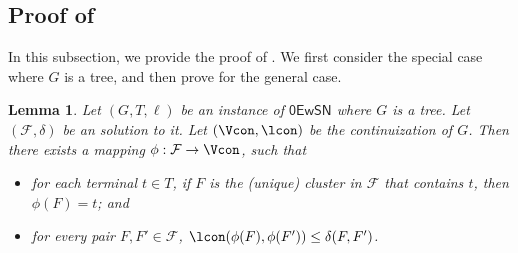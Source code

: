 \documentclass[11pt]{article}
\newtheorem{lemma}[theorem]{Lemma}
\theoremstyle{definition}
\newcommand{\fset}{{\mathcal{F}}}
\newcommand{\zesn}{\mathsf{0EwSN}}
\begin{document}
\subsection{Proof of }
\label{subsec: diam-girth}


In this subsection, we provide the proof of . We first consider the special case where $G$ is a tree, and then prove  for the general case.

\begin{lemma} \label{lem:embed-tree}
Let $(G,T,\ell)$ be an instance of $\zesn$ where $G$ is a tree. Let $(\fset,\delta)$ be an solution to it. Let $(\Vcon, \lcon)$ be the continuization of $G$. Then there exists a mapping $\phi: \fset \to \Vcon$, such that
\begin{itemize}
	\item for each terminal $t\in T$, if $F$ is the (unique) cluster in $\fset$ that contains $t$, then $\phi(F)=t$; and
	\item for every pair $F,F'\in \fset$,
	$\lcon(\phi(F),\phi(F')) \le \delta(F,F')$.
\end{itemize}
\end{lemma}
\end{document}
